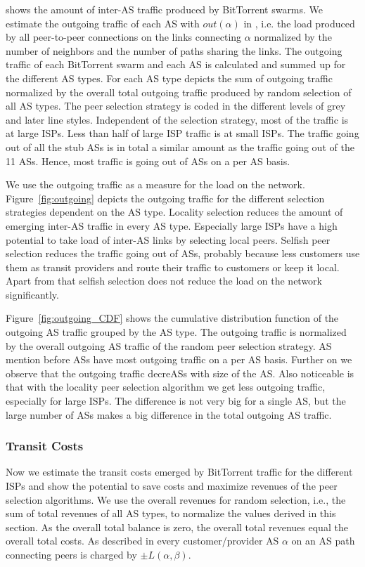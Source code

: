  shows the amount of inter-AS traffic produced by BitTorrent swarms. We estimate the outgoing traffic of each AS with $out(\alpha)$ in , i.e. the load produced by all peer-to-peer connections on the links connecting $\alpha$ normalized by the number of neighbors and the number of paths sharing the links. The outgoing traffic of each BitTorrent swarm and each AS is calculated and summed up for the different AS types. For each AS type  depicts the sum of outgoing traffic normalized by the overall total outgoing traffic produced by random selection of all AS types. The peer selection strategy is coded in the different levels of grey and later line styles. Independent of the selection strategy, most of the traffic is at large ISPs. Less than half of large ISP traffic is at small ISPs. The traffic going out of all the stub ASs is in total a similar amount as the traffic going out of the 11 \tier ASs. Hence, most traffic is going out of \tier ASs on a per AS basis.

We use the outgoing traffic as a measure for the load on the network.
Figure~\ref{fig:outgoing} depicts the outgoing traffic for the different selection strategies dependent on the AS type. Locality selection reduces the amount of emerging inter-AS traffic in every AS type. Especially large ISPs have a high potential to take load of inter-AS links by selecting local peers. Selfish peer selection reduces the traffic going out of \tier ASs, probably because less customers use them as transit providers and route their traffic to customers or keep it local. Apart from that selfish selection does not reduce the load on the network significantly.

Figure~\ref{fig:outgoing_CDF} shows the cumulative distribution function of the outgoing AS traffic grouped by the AS type. The outgoing traffic is normalized by the overall outgoing AS traffic of the random peer selection strategy. AS mention before \tier ASs have most outgoing traffic on a per AS basis. Further on we observe that the outgoing traffic decreASs with size of the AS. Also noticeable is that with the locality peer selection algorithm we get less outgoing traffic, especially for large ISPs. The difference is not very big for a single AS, but the large number of ASs makes a big difference in the total outgoing AS traffic.

\subsubsection{Transit Costs}
Now we estimate the transit costs emerged by BitTorrent traffic for the different ISPs and show the potential to save costs and maximize revenues of the peer selection algorithms. We use the overall revenues for random selection, i.e., the sum of total revenues of all AS types, to normalize the values derived in this section. As the overall total balance is zero, the overall total revenues equal the overall total costs.
As described in  every customer/provider AS $\alpha$ on an AS path connecting peers is charged by $\pm L(\alpha,\beta)$.

